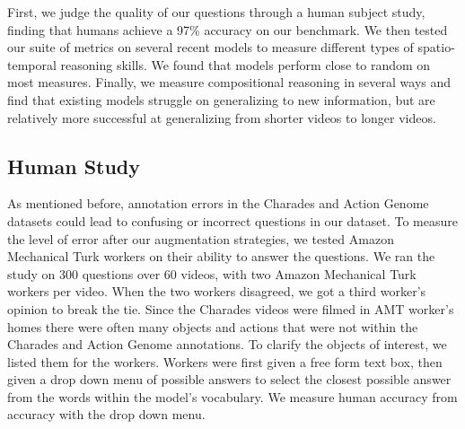 \documentclass[10pt,twocolumn,letterpaper]{article}
\begin{document}



First, we judge the quality of our questions through a human subject study, finding that humans achieve a 97\% accuracy on our benchmark. We then tested our suite of metrics on several recent models to measure different types of spatio-temporal reasoning skills. We found that models perform close to random on most measures. Finally, we measure compositional reasoning in several ways and find that existing models struggle on generalizing to new information, but are relatively more successful at generalizing from shorter videos to longer videos.

\subsection{Human Study}

As mentioned before, annotation errors in the Charades and Action Genome datasets could lead to confusing or incorrect questions in our dataset. To measure the level of error after our augmentation strategies, we tested Amazon Mechanical Turk workers on their ability to answer the questions. We ran the study on 300 questions over 60 videos, with two Amazon Mechanical Turk workers per video. When the two workers disagreed, we got a third worker's opinion to break the tie. Since the Charades videos were filmed in AMT worker's homes there were often many objects and actions that were not within the Charades and Action Genome annotations. To clarify the objects of interest, we listed them for the workers. Workers were first given a free form text box, then given a drop down menu of possible answers to select the closest possible answer from the words within the model's vocabulary. We measure human accuracy from accuracy with the drop down menu. 
\end{document}
